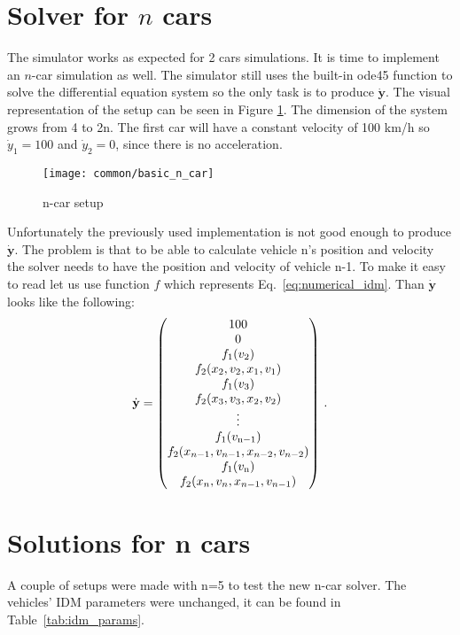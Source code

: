 	\section{Solver for $n$ cars}
		The simulator works as expected for 2 cars simulations. It is time to implement an $n$-car simulation as well. The simulator still uses the built-in ode45 function to solve the differential equation system so the only task is to produce $\dot{\textbf{y}}$. The visual representation of the setup can be seen in Figure \ref{fig:basic_n_car}. The dimension of the system grows from 4 to 2n. The first car will have a constant velocity of 100 km/h so $\dot{y}_1 = 100$ and $\dot{y}_2 = 0$, since there is no acceleration.
		\begin{figure}
			\centering
			\texttt{[image: common/basic\_n\_car]}
			\caption{n-car setup}
			\label{fig:basic_n_car}
		\end{figure}
		Unfortunately the previously used implementation is not good enough to produce $\dot{\textbf{y}}$. The problem is that to be able to calculate vehicle n's position and velocity the solver needs to have the position and velocity of vehicle n-1. To make it easy to read let us use function $f$ which represents Eq.~\eqref{eq:numerical_idm}. Than $\dot{\textbf{y}}$ looks like the following:
		\begin{equation}
			\dot{\textbf{y}}=
			\begin{pmatrix}
				100\\
				0\\
				f_1(v_{2})\\
				f_2(x_{2}, v_{2},x_{1}, v_{1})\\
				f_1(v_{3})\\
				f_2(x_{3}, v_{3},x_{2}, v_{2})\\
				\vdots\\
				f_1(v_{\rm n-1})\\
				f_2(x_{n-1}, v_{n-1},x_{n-2}, v_{n-2})\\
				f_1(v_{\rm n})\\
				f_2(x_{n}, v_{n},x_{n-1}, v_{n-1})
			\end{pmatrix}\,.
			\label{eq:n_ode_math}
		\end{equation}
		\section{Solutions for n cars}
		A couple of setups were made with n=5 to test the new n-car solver. The vehicles' IDM parameters were unchanged, it can be found in Table~\ref{tab:idm_params}.
